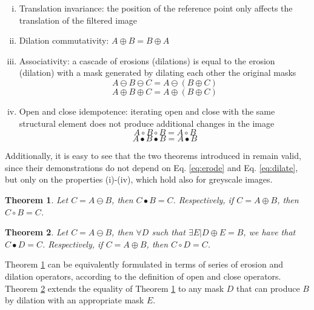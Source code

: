 \documentclass[review]{elsarticle}
\newtheorem{theorem}{Theorem}
\begin{document}
\begin{enumerate}[(i)]
	\item Translation invariance: the position of the reference point only affects the translation of the filtered image
	\item Dilation commutativity: $A\oplus B = B \oplus A$
	\item Associativity: a cascade of erosions (dilations) is equal to the erosion (dilation) with a mask generated by dilating each other the original masks
	\begin{equation}
	A \ominus B \ominus C = A \ominus (B \oplus C)
	\end{equation}
	\begin{equation}
	A \oplus B \oplus C = A \oplus (B \oplus C)
	\end{equation} 
	\item Open and close idempotence: iterating open and close with the same structural element does not produce additional changes in the image
	\begin{equation}
	A \circ B \circ B = A \circ B
	\end{equation}
	\begin{equation}
	A \bullet B \bullet B = A \bullet B
	\end{equation} 
\end{enumerate}

Additionally, it is easy to see that the two theorems introduced in \cite{de2017detecting} remain valid, since their demonstrations do not depend on Eq. \ref{eq:erode} and Eq. \ref{eq:dilate}, but only on the properties (i)-(iv), which hold also for greyscale images.

\begin{theorem}
	\label{theorem_1}
	Let $C = A\ominus B$, then $C\bullet B = C$. Respectively, if $C = A \oplus B$, then $C\circ B = C$.
\end{theorem}

\begin{theorem}
	\label{theorem_2}
	Let $C = A\ominus B$, then $\forall D$ such that $\exists E | D\oplus E = B$, we have that $C\bullet D = C$. Respectively, if $C = A \oplus B$, then $C \circ D = C$.
\end{theorem}

Theorem \ref{theorem_1} can be equivalently formulated in terms of series of erosion and dilation operators, according to the definition of open and close operators. Theorem \ref{theorem_2} extends the equality of Theorem \ref{theorem_1} to any mask $D$ that can produce $B$ by dilation with an appropriate mask $E$.
\end{document}
